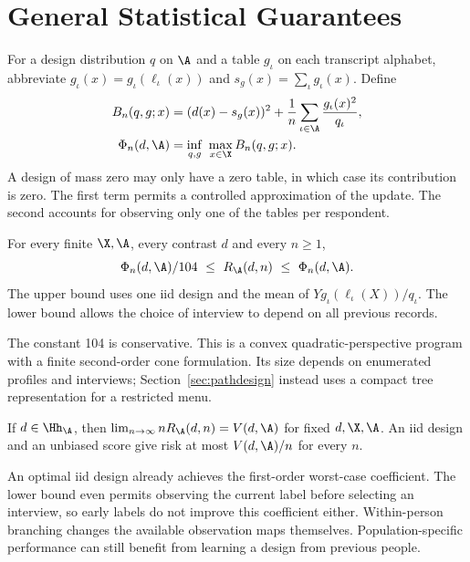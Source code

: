 \section{General Statistical Guarantees}\label{app:generalstatements}
For a design distribution $q$ on $\A$ and a table $g_\iota$ on each transcript alphabet, abbreviate $g_\iota(x)=g_\iota(\ell_\iota(x))$ and $s_g(x)=\sum_\iota g_\iota(x)$. Define
\begin{align}
 B_n(q,g;x)&=(d(x)-s_g(x))^2+
              \frac1n\sum_{\iota\in\A}\frac{g_\iota(x)^2}{q_\iota},\nonumber\\
 \Phi_n(d,\A)&=\inf_{q,g}\ \max_{x\in\X}B_n(q,g;x).
 \label{eq:program}
\end{align}
A design of mass zero may only have a zero table, in which case its contribution is zero. The first term permits a controlled approximation of the update. The second accounts for observing only one of the tables per respondent.

\begin{theorem}\label{thm:finite}
For every finite $\X,\A$, every contrast $d$ and every $n\ge1$,
\[
       \Phi_n(d,\A)/104 \ \le\ R_\A(d,n)\ \le\ \Phi_n(d,\A).
\]
The upper bound uses one iid design and the mean of $Yg_\iota(\ell_\iota(X))/q_\iota$. The lower bound allows the choice of interview to depend on all previous records.
\end{theorem}

The constant 104 is conservative. This is a convex quadratic-perspective program with a finite second-order cone formulation. Its size depends on enumerated profiles and interviews; Section~\ref{sec:pathdesign} instead uses a compact tree representation for a restricted menu.

\begin{samepage}
\begin{theorem}\label{thm:asym}
If $d\in\Hh_{\A}$, then $\lim_{n\to\infty}nR_\A(d,n)=V(d,\A)$ for fixed $d,\X,\A$. An iid design and an unbiased score give risk at most $V(d,\A)/n$ for every $n$.
\end{theorem}
\end{samepage}

An optimal iid design already achieves the first-order worst-case coefficient. The lower bound even permits observing the current label before selecting an interview, so early labels do not improve this coefficient either. Within-person branching changes the available observation maps themselves. Population-specific performance can still benefit from learning a design from previous people.

